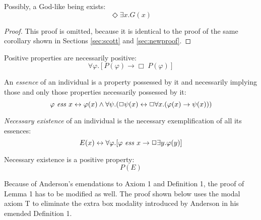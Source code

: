 \documentclass[smallextended]{svjour3}
\newcommand{\imp}{\rightarrow}
\newcommand{\biimp}{\leftrightarrow}
\newcommand{\all}{\forall}
\newcommand{\ex}{\exists}
\newcommand{\nec}{\Box} %
\newcommand{\pos}{\Diamond} %
\begin{document}
\begin{corollary}
\label{A:C1}
Possibly, a God-like being exists:
$$
\pos \ex x. G(x)
$$
\end{corollary}
\begin{proof}
This proof is omitted, because it is identical to the proof of the same corollary shown in Sections \ref{sec:scott} and \ref{sec:newproof}.
\end{proof}




\begin{axiom}[As in Scott's]
\label{A:A4}
Positive properties are necessarily positive:
$$
\all \varphi.[P(\varphi) \to \Box \; P(\varphi)]
$$
\end{axiom}

\begin{definition}[Emended]
\label{A:D2}
An \emph{essence} of an individual is a property possessed by it and necessarily implying those and only those properties necessarily possessed by it:
$$
\ess{\varphi}{x} \biimp \varphi(x) \wedge \all \psi. (\nec \psi(x) \biimp \nec \all x. (\varphi(x) \imp \psi(x)))
$$
\end{definition}



\begin{definition}[As in Scott's]
\label{A:D3}
\emph{Necessary existence} of an individual is the necessary exemplification of all its essences:
$$
E(x) \biimp \all \varphi.[\ess{\varphi}{x} \imp \nec \ex y.\varphi(y)]
$$
\end{definition}


\begin{axiom}[As in Scott's]
\label{A:A5}
Necessary existence is a positive property:
$$
P(E)
$$
\end{axiom}


Because of Anderson's emendations to Axiom 1 and Definition 1, the proof of Lemma 1 has to be modified as well. The proof shown below uses the modal axiom T to eliminate the extra box modality introduced by Anderson
in his emended Definition 1.
\end{document}
